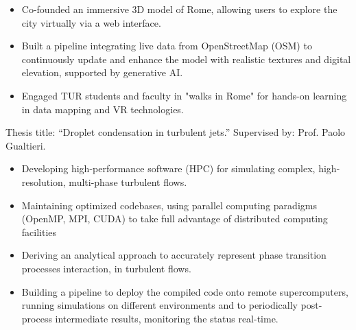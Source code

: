 	\newline
	\begin{itemize}
		\item Co-founded an immersive 3D model of Rome, allowing users to explore the city virtually via a web interface.
		\item Built a pipeline integrating live data from OpenStreetMap (OSM) to continuously update and enhance the model with realistic textures and digital elevation, supported by generative AI.
		\item Engaged TUR students and faculty in "walks in Rome" for hands-on learning in data mapping and VR technologies.
	\end{itemize}
	\smallskip
\fi

\bigskip

\newpage
{}

\iflongversion

	\newline
	Thesis title: ``Droplet condensation in turbulent jets.'' Supervised by: Prof. Paolo Gualtieri. \\
	\smallskip
	\begin{itemize}
		\item Developing high-performance software (HPC) for simulating complex, high-resolution, multi-phase turbulent flows.
		\item Maintaining optimized codebases, using parallel computing paradigms (OpenMP, MPI, CUDA) to take full advantage of distributed computing facilities
		\item Deriving an analytical approach to accurately represent phase transition processes interaction, in turbulent flows.
		\item Building a pipeline to deploy the compiled code onto remote supercomputers, running simulations on different environments and to periodically post-process intermediate results, monitoring the status real-time.
	\end{itemize}
	\medskip
	\
	\medskip

